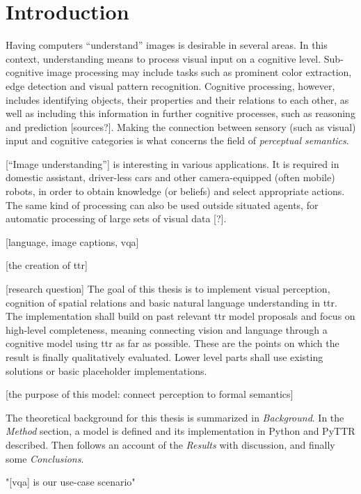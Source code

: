 \glsresetall
\section{Introduction}
\label{sec:intro}

Having computers ``understand'' images is desirable in several areas.
In this context, understanding means to process visual input on a cognitive level.
Sub-cognitive image processing may include tasks such as prominent color extraction, edge detection and visual pattern recognition.
Cognitive processing, however, includes identifying objects, their properties and their relations to each other, as well as including this information in further cognitive processes, such as reasoning and prediction [sources?].
Making the connection between sensory (such as visual) input and cognitive categories is what concerns the field of \textit{perceptual semantics}.

[``Image understanding''] is interesting in various applications.
It is required in domestic assistant, driver-less cars and other camera-equipped (often mobile) robots, in order to obtain knowledge (or beliefs) and select appropriate actions.
The same kind of processing can also be used outside situated agents, for automatic processing of large sets of visual data [?].

[language, image captions, vqa]

[the creation of ttr]

[research question]
The goal of this thesis is to implement visual perception, cognition of spatial relations and basic natural language understanding in \gls{ttr}.
The implementation shall build on past relevant \gls{ttr} model proposals and focus on high-level completeness, meaning connecting vision and language through a cognitive model using \gls{ttr} as far as possible.
These are the points on which the result is finally qualitatively evaluated.
Lower level parts shall use existing solutions or basic placeholder implementations.

[the purpose of this model: connect perception to formal semantics]

The theoretical background for this thesis is summarized in \textit{Background}.
In the \textit{Method} section, a model is defined and its implementation in Python and PyTTR described.
Then follows an account of the \textit{Results} with discussion, and finally some \textit{Conclusions}.

"[vqa] is our use-case scenario"